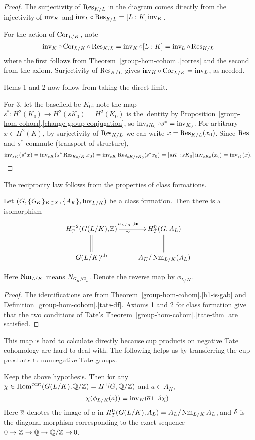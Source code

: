 \begin{proof}
The surjectivity of $\operatorname{Res}_{K/L}$ in the diagram comes directly from the injectivity of $\operatorname{inv}_K$ and $\operatorname{inv}_L\circ \operatorname{Res}_{K/L}=[L:K]\operatorname{inv}_K$.

For the action of $\operatorname{Cor}_{L/K}$, note
\[
\operatorname{inv}_K\circ \operatorname{Cor}_{L/K}\circ\operatorname{Res}_{K/L}=\operatorname{inv}_K\circ[L:K] =\operatorname{inv}_L\circ \operatorname{Res}_{K/L}
\]
where the first follows from Theorem~\ref{group-hom-cohom}.\ref{corres} and the second from the axiom. Surjectivity of $\operatorname{Res}_{K/L}$ gives $\operatorname{inv}_K\circ \operatorname{Cor}_{L/K}=\operatorname{inv}_L$, as needed.

Items 1 and 2 now follow from taking the direct limit.

For 3, let the basefield be $K_0$; note the map $s^*:H^2(K_0)\to H^2(sK_0)=H^2(K_0)$ is the identity by Proposition~\ref{group-hom-cohom}.\ref{change-group-conjugation}, so $\operatorname{inv}_{sK_0}\circ s^*=\operatorname{inv}_{K_0}$. For arbitrary $x\in H^2(K)$, by surjectivity of $\operatorname{Res}_{K/L}$ we can write $x=\operatorname{Res}_{K/L}(x_0)$. Since $\operatorname{Res}$ and $s^*$ commute (transport of structure),
\[
\operatorname{inv}_{sK}(s^*x)=\operatorname{inv}_{sK} (s^*\operatorname{Res}_{K_0/K}x_0)
=\operatorname{inv}_{sK} \operatorname{Res}_{sK/sK_0}(s^*x_0)
=[sK:sK_0] \operatorname{inv}_{sK_0}(x_0)=\operatorname{inv}_K(x).
\]
\end{proof}
The reciprocity law follows from the properties of class formations.
\begin{thm}
Let $(G, \{G_K\}_{K\in X}, \{A_K\},\operatorname{inv}_{L/K})$ be a class formation. Then there is a isomorphism
\[
\xymatrix{
H_T^{-2}(G(L/K),\Z)\ar[r]^{u_{L/K}\cup \bullet}_{\cong}\ar@{=}[d] & H_T^0(G,A_L)\ar@{=}[d]\\
G(L/K)^\text{ab}& A_K/\nm_{L/K}(A_L)}
\]
\end{thm}
Here $\operatorname{Nm}_{L/K}$ means $N_{G_K/G_L}$. Denote the reverse map by $\phi_{L/K}$.
\begin{proof}
The identifications are from Theorem~\ref{group-hom-cohom}.\ref{h1-is-gab} and Definition~\ref{group-hom-cohom}.\ref{tate-df}. Axioms 1 and 2 for class formation give that the two conditions of Tate's Theorem~\ref{group-hom-cohom}.\ref{tate-thm} are satisfied.
\end{proof}
This map is hard to calculate directly because cup products on negative Tate cohomology are hard to deal with. 
The following helps us by transferring the cup products to nonnegative Tate groups.
\begin{thm}
Keep the above hypothesis. Then for any $\chi\in \operatorname{Hom}^{\text{cont}}(G(L/K),\mathbb{Q}/\mathbb{Z})=H^1(G,\mathbb{Q}/\mathbb{Z})$ and $a\in A_K$,
\[
\chi(\phi_{L/K}(a))=\operatorname{inv}_K(\overline{a}\cup \delta \chi).
\]
Here $\overline{a}$ denotes the image of $a$ in $H_T^{0}(G(L/K),A_L)=A_L/\operatorname{Nm}_{L/K}A_L$, and $\delta$ is the diagonal morphism corresponding to the exact sequence $0\to \mathbb{Z}\to \mathbb{Q}\to \mathbb{Q}/\mathbb{Z}\to 0$.
\end{thm}
